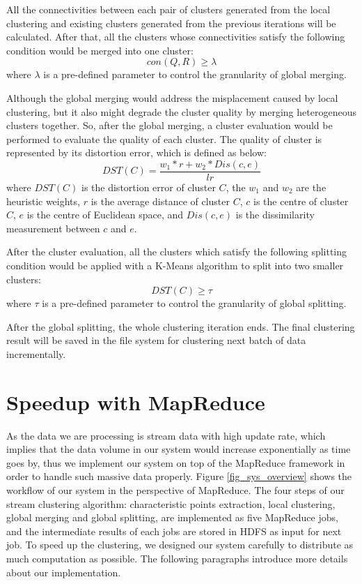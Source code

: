 \documentclass[conference]{IEEEtran}
\begin{document}
All the connectivities between each pair of clusters generated from the local clustering and existing clusters generated from the previous iterations will be calculated. After that, all the clusters whose connectivities satisfy the following condition would be merged into one cluster:
\begin{equation}\label{eq_mergingCondition}
con(Q, R) \geq \lambda
\end{equation}
where $ \lambda $ is a pre-defined parameter to control the granularity of global merging.


Although the global merging would address the misplacement caused by local clustering, but it also might degrade the cluster quality by merging heterogeneous clusters together. So, after the global merging, a cluster evaluation would be performed to evaluate the quality of each cluster. The quality of cluster is represented by its distortion error, which is defined as below:
\begin{equation}\label{eq_quality}
DST(C) = \frac{w_1 * r + w_2 * Dis(c, e )}{lr}
\end{equation}
where $ DST(C) $ is the distortion error of cluster $ C $, the $ w_1 $ and $ w_2 $ are the heuristic weights, $ r $ is the average distance of cluster $ C $, $ c $ is the centre of cluster $ C $, $ e $ is the centre of Euclidean space, and $ Dis(c, e) $ is the dissimilarity measurement between $ c $ and $ e $. 


After the cluster evaluation, all the clusters which satisfy the following splitting condition would be applied with a K-Means algorithm to split into two smaller clusters:
\begin{equation}\label{eq_splittingCondition}
DST(C) \geq \tau
\end{equation} 
where $ \tau $ is a pre-defined parameter to control the granularity of global splitting. 


After the global splitting, the whole clustering iteration ends. The final clustering result will be saved in the file system for clustering next batch of data incrementally.


\section{Speedup with MapReduce}
As the data we are processing is stream data with high update rate, which implies that the data volume in our system would increase exponentially as time goes by, thus we implement our system on top of the MapReduce framework in order to handle such massive data properly. Figure \ref{fig_sys_overview} shows the workflow of our system in the perspective of MapReduce. The four steps of our stream clustering algorithm: characteristic points extraction, local clustering, global merging and global splitting, are implemented as five MapReduce jobs, and the intermediate results of each jobs are stored in HDFS as input for next job. To speed up the clustering, we designed our system carefully to distribute as much computation as possible. The following paragraphs introduce more details about our implementation.
\end{document}

